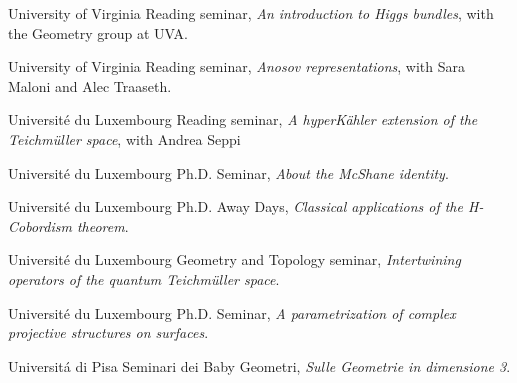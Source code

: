 {University of Virginia}
{Reading seminar,}
{\emph{An introduction to Higgs bundles}, with the Geometry group at UVA.}

{University of Virginia}
{Reading seminar,}
{\emph{Anosov representations}, with Sara Maloni and Alec Traaseth.}

{Universit{\'e} du Luxembourg}
{Reading seminar,}
{\emph{A hyperK{\"a}hler extension of the Teichm{\"u}ller space}, with Andrea Seppi}

{Universit{\'e} du Luxembourg}
{Ph.D. Seminar,}
{\emph{About the McShane identity}.}

{Universit{\'e} du Luxembourg}
{Ph.D. Away Days,}
{\emph{Classical applications of the H-Cobordism theorem}.}

{Universit{\'e} du Luxembourg}
{Geometry and Topology seminar,}
{\emph{Intertwining operators of the quantum Teichm\"uller space}.}

{Universit{\'e} du Luxembourg}
{Ph.D. Seminar,}
{\emph{A parametrization of complex projective structures on surfaces}.}

{Universit{\'a} di Pisa}
{Seminari dei Baby Geometri,}
{\emph{Sulle Geometrie in dimensione 3}.}
